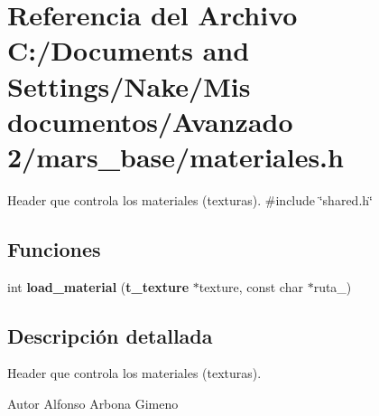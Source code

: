 \section{Referencia del Archivo C:/Documents and Settings/Nake/Mis documentos/Avanzado 2/mars\_\-base/materiales.h}
\label{materiales_8h}


Header que controla los materiales (texturas).  
{\ttfamily \#include \char`\"{}shared.h\char`\"{}}\par
\subsection*{Funciones}
\begin{DoxyCompactItemize}
\item 
int {\bfseries load\_\-material} ({\bf t\_\-texture} $\ast$texture, const char $\ast$ruta\_\-)\label{materiales_8h_af92acd8f558230e1d94175ee20f6c432}

\end{DoxyCompactItemize}


\subsection{Descripción detallada}
Header que controla los materiales (texturas). \begin{DoxyAuthor}{Autor}
Alfonso Arbona Gimeno 
\end{DoxyAuthor}
